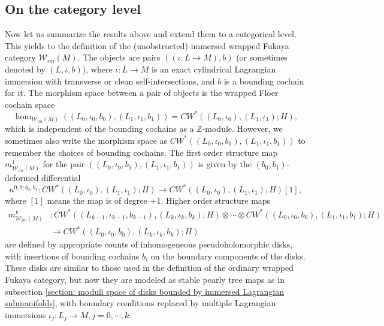 \documentclass{amsart}
\numberwithin{equation}{section}
\numberwithin{figure}{section}
\begin{document}
\subsection{On the category level}
	Now let us summarize the results above and extend them to a categorical level. This yields to the definition of the (unobstructed) immersed wrapped Fukaya category $\mathcal{W}_{im}(M)$. The objects are pairs $((\iota: L \to M), b)$ (or sometimes denoted by $(L, \iota, b)$), where $\iota: L \to M$ is an exact cylindrical Lagrangian immersion with transverse or clean self-intersections, and $b$ is a bounding cochain for it. The morphism space between a pair of objects is the wrapped Floer cochain space
\begin{equation*}
\hom_{\mathcal{W}_{im}(M)}((L_{0}, \iota_{0}, b_{0}), (L_{1}, \iota_{1}, b_{1})) = CW^{*}((L_{0}, \iota_{0}), (L_{1}, \iota_{1}); H),
\end{equation*}
which is independent of the bounding cochains as a $\mathbb{Z}$-module. However, we sometimes also write the morphism space as $CW^{*}((L_{0}, \iota_{0}, b_{0}), (L_{1}, \iota_{1}, b_{1}))$ to remember the choices of bounding cochains. The first order structure map $m^{1}_{\mathcal{W}_{im}(M)}$ for the pair $((L_{0}, \iota_{0}, b_{0}), (L_{1}, \iota_{1}, b_{1}))$ is given by the $(b_{0}, b_{1})$-deformed differential
\begin{equation*}
n^{0, 0; b_{0}, b_{1}}: CW^{*}((L_{0}, \iota_{0}), (L_{1}, \iota_{1}); H) \to CW^{*}((L_{0}, \iota_{0}), (L_{1}, \iota_{1}); H)[1],
\end{equation*}
where $[1]$ means the map is of degree $+1$.
Higher order structure maps
\begin{equation}
\begin{split}
m^{k}_{\mathcal{W}_{im}(M)}&: CW^{*}((L_{k-1}, \iota_{k-1}, b_{k-1}), (L_{k}, \iota_{k}, b_{k}); H) \otimes \cdots \otimes CW^{*}((L_{0}, \iota_{0}, b_{0}), (L_{1}, \iota_{1}, b_{1}); H)\\
& \to CW^{*}((L_{0}, \iota_{0}, b_{0}), (L_{k}, \iota_{k}, b_{k}); H)
\end{split}
\end{equation}
are defined by appropriate counts of inhomogeneous pseudoholomorphic disks, with insertions of bounding cochains $b_{i}$ on the boundary components of the disks. These disks are similar to those used in the definition of the ordinary wrapped Fukaya category, but now they are modeled as stable pearly tree maps as in subsection \ref{section: moduli space of disks bounded by immersed Lagrangian submanifolds}, with boundary conditions replaced by multiple Lagrangian immersions $\iota_{j}: L_{j} \to M, j = 0, \cdots, k$. \par
\end{document}

